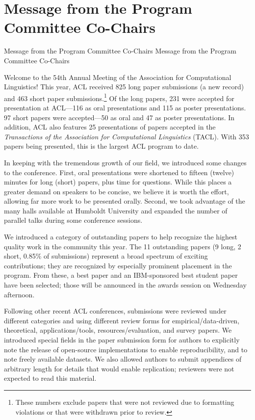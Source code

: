 
\section{Message from the Program Committee Co-Chairs}\vspace{2em}
\setheaders%
    {Message from the Program Committee Co-Chairs}%
    {Message from the Program Committee Co-Chairs}
\thispagestyle{emptyheader}

\setlength{\parskip}{1ex}

Welcome to the 54th Annual Meeting of the Association for Computational Linguistics! This year, ACL received 825 long paper submissions (a new record)
and 463 short paper submissions.\footnote{These numbers exclude papers that were not reviewed due to formatting violations or that were withdrawn prior to review.}  
Of the long papers, 231 were accepted for presentation at ACL---116 as oral presentations and 115 as poster presentations. 97 short papers were accepted---50 as oral and 47 as poster presentations. In addition, ACL also features 25 presentations of papers accepted in the \emph{Transactions of the Association for Computational Linguistics} (TACL).  With 353 papers being presented, this is the largest ACL program to date.

In keeping with the tremendous growth of our field, we introduced some changes to the conference.  First, oral presentations were shortened to fifteen (twelve) minutes for long (short) papers, plus time for questions.  While this places a greater demand on speakers to be concise, we believe it is worth the effort, allowing far more work to be presented orally.  Second, we took advantage of the many halls available at Humboldt University and expanded the number of parallel talks during some conference sessions.  

We introduced a category of outstanding papers to help recognize the highest quality work in the community this year.  The 11 outstanding papers (9 long, 2 short, 0.85\% of submissions) represent a broad spectrum of exciting contributions; they are recognized by especially prominent placement in the program.  From these, a best paper and an IBM-sponsored best student paper have been selected; those will be announced in the awards session on Wednesday afternoon.

Following other recent ACL conferences, submissions were reviewed under different categories and using different review forms for empirical/data-driven, theoretical, applications/tools, resources/evaluation, and survey papers.  We introduced special fields in the paper submission form for authors to explicitly note the release of open-source implementations to enable reproducibility, and to note freely available datasets. We also allowed authors to submit appendices of arbitrary length for details that would enable replication; reviewers were not expected to read this material.

